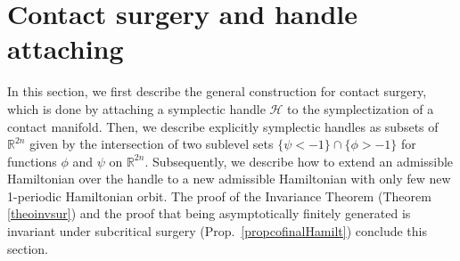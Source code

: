\documentclass[a4paper,12pt,bibliography=totocnumbered,titlepage=false,abstracton,bookmarksnumbered=true]{scrartcl}
\theoremstyle{definition}
\begin{document}
\section{Contact surgery and handle attaching}\label{secsur}
In this section, we first describe the general construction for contact surgery, which is done by attaching a symplectic handle $\mathcal{H}$ to the symplectization of a contact manifold. Then, we describe explicitly symplectic handles as subsets of $\mathbb{R}^{2n}$ given by the intersection of two sublevel sets $\{\psi {<}{-}1\}\cap\{\phi{>}{-}1\}$ for functions $\phi$ and $\psi$ on $\mathbb{R}^{2n}$. Subsequently, we describe how to extend an admissible Hamiltonian over the handle to a new admissible Hamiltonian with only few new 1-periodic Hamiltonian orbit. The proof of the Invariance Theorem (Theorem \ref{theoinvsur}) and the proof that being asymptotically finitely generated is invariant under subcritical surgery (Prop.\ \ref{propcofinalHamilt}) conclude this section.
\end{document}
